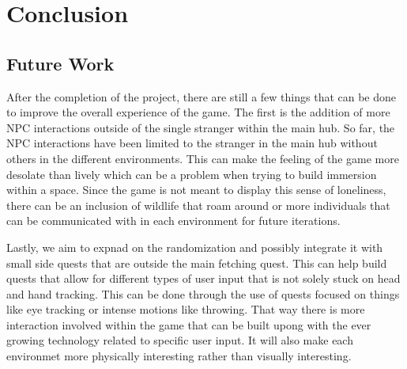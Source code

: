 \documentclass{vgtc}                          %
\begin{document}
\section{Conclusion}
\subsection*{Future Work}
After the completion of the project, there are still a few things that can be done to improve the overall experience of the game. The first is the addition of more NPC interactions outside of the single stranger within the main hub. So far, the NPC interactions have been limited to the stranger in the main hub without others in the different environments. This can make the feeling of the game more desolate than lively
which can be a problem when trying to build immersion within a space. Since the game is not meant to display this sense of loneliness, there can be an inclusion of wildlife that roam around or more individuals that can be communicated with in each environment for future iterations.

Lastly, we aim to expnad on the randomization and possibly integrate it with small side quests that are outside the main fetching quest. This can help build quests that allow for different types of user input that is not solely stuck on head and hand tracking. This can be done through the use of quests focused on things like eye tracking or intense motions like throwing. That way there is more interaction involved within
the game that can be built upong with the ever growing technology related to specific user input. It will also make each environmet more physically interesting rather than visually interesting.


%

%
%
%


\end{document}
